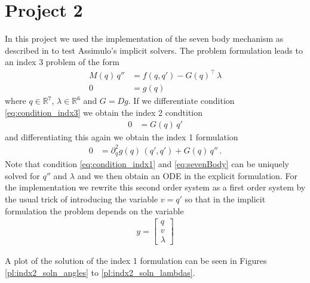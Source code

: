 \documentclass{report}
\def\R{\mathbb{R}}
\newcommand{\vect}[1]{\begin{bmatrix} #1 \end{bmatrix}}
\begin{document}
\chapter*{Project 2}

In this project we used the implementation of the seven body mechanism as described in \cite{HW_SolvingODEs} to test Assimulo's implicit solvers. The problem formulation leads to an index 3 problem of the form
\begin{align}
	M(q)\,q''&= f(q,q')-G(q)^\top\,\lambda\label{eq:sevenBody} \\
	0 &= g(q) \label{eq:condition_indx3}
\end{align}
where $q\in\R^7$, $\lambda\in\R^6$ and $G=Dg$. If we differentiate condition \eqref{eq:condition_indx3} we obtain the index 2 condtition
\begin{align*}
	0&=G(q)\,q'
\end{align*}
and differentiating this again we obtain the index 1 formulation
\begin{align*}
	0&= \partial_q^2g(q)\,(q',q')+G(q)\,q''\,.  \label{eq:condition_indx1}
\end{align*}
Note that condition \eqref{eq:condition_indx1} and \eqref{eq:sevenBody} can be uniquely solved for $q''$ and $\lambda$ and we then obtain an ODE in the explicit formulation.
For the implementation we rewrite this second order system as a first order system by the usual trick of introducing the variable $v=q'$ so that in the implicit formulation the problem depends on the variable
\begin{align*}
	y = \vect{q \\ v \\ \lambda}
\end{align*}

A plot of the solution of the index 1 formulation can be seen in Figures \ref{pl:indx2_soln_angles} to \ref{pl:indx2_soln_lambdas}.
\end{document}
